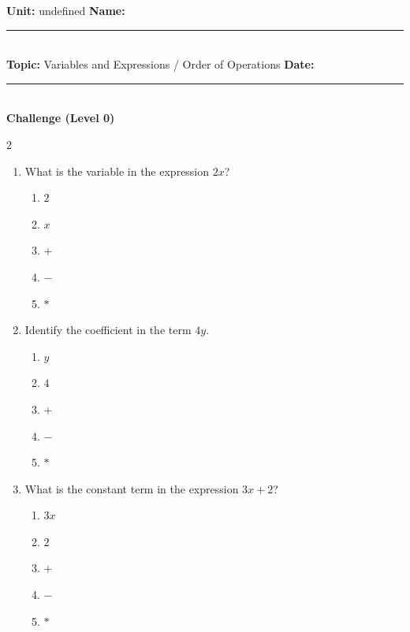 \documentclass[10pt]{article}
\begin{document}
\enlargethispage{2.5cm}

\begin{tcolorbox}[colback=mainblue!5, colframe=mainblue, sharp corners, boxrule=0.5pt]
    \small \textbf{Unit:} undefined \hfill \textbf{Name:} \rule{3cm}{0.4pt} \\
    \small \textbf{Topic:} Variables and Expressions / Order of Operations \hfill \textbf{Date:} \rule{2cm}{0.4pt} \\
    \centering \textbf{\large Challenge (Level 0)}
\end{tcolorbox}

\vspace{0.2cm}

\begin{multicols}{2}
\begin{enumerate}[label=\textbf{Q\arabic*.}, leftmargin=*, itemsep=6pt, parsep=0pt]

  \item \small What is the variable in the expression $2x$?
  \begin{enumerate}[label=(\Alph*), leftmargin=0.6cm, nosep, itemsep=2pt]
    \item $2$
    \item $x$
    \item $+$
    \item $-$
    \item $*$
  \end{enumerate}

  \item \small Identify the coefficient in the term $4y$.
  \begin{enumerate}[label=(\Alph*), leftmargin=0.6cm, nosep, itemsep=2pt]
    \item $y$
    \item $4$
    \item $+$
    \item $-$
    \item $*$
  \end{enumerate}

  \item \small What is the constant term in the expression $3x + 2$?
  \begin{enumerate}[label=(\Alph*), leftmargin=0.6cm, nosep, itemsep=2pt]
    \item $3x$
    \item $2$
    \item $+$
    \item $-$
    \item $*$
  \end{enumerate}


\end{enumerate}
\end{multicols}
\end{document}

